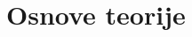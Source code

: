 \documentclass[a4paper,10pt]{article}
\begin{document}















\section{Osnove teorije}
\end{document}
